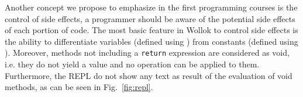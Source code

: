 \bigskip 
Another concept we propose to emphasize in the first programming courses is the control of side effects, 
\ie a programmer should be aware of the potential side effects of each portion of code.
The most basic feature in Wollok to control side effects is the ability to 
differentiate variables (defined using )
from constants (defined using ).
Moreover, methods not including a \texttt{return} expression are considered as void, i.e. they do not yield a value and no operation can be applied to them. Furthermore, the REPL do not show any text as result of the evaluation of void methods, as can be seen in Fig.~\ref{fig:repl}.
